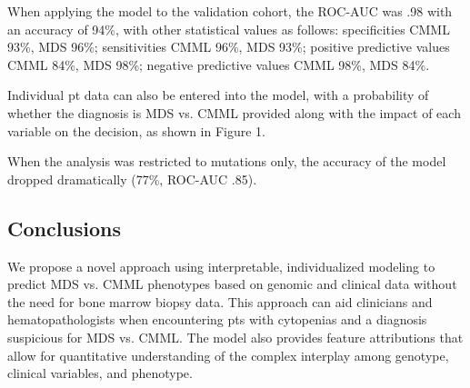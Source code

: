 When applying the model to the validation cohort, the ROC-AUC was .98 with an accuracy of 94\%, with other statistical values as follows: specificities CMML 93\%, MDS 96\%; sensitivities CMML 96\%, MDS 93\%; positive predictive values CMML 84\%, MDS 98\%; negative predictive values CMML 98\%, MDS 84\%.

Individual pt data can also be entered into the model, with a probability of whether the diagnosis is MDS vs. CMML provided along with the impact of each variable on the decision, as shown in Figure 1.

When the analysis was restricted to mutations only, the accuracy of the model dropped dramatically (77\%, ROC-AUC .85).


\subsection{Conclusions}%

We propose a novel approach using interpretable, individualized modeling to predict MDS vs. CMML phenotypes based on genomic and clinical data without the need for bone marrow biopsy data. This approach can aid clinicians and hematopathologists when encountering pts with cytopenias and a diagnosis suspicious for MDS vs. CMML. The model also provides feature attributions that allow for quantitative understanding of the complex interplay among genotype, clinical variables, and phenotype.


